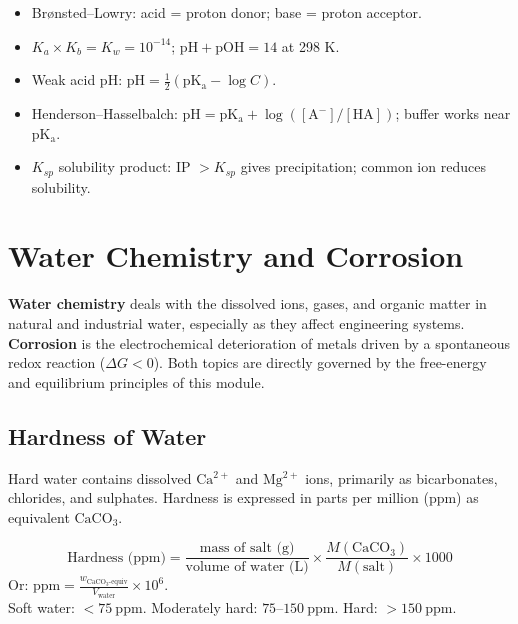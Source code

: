 \documentclass[12pt,a4paper]{article}
\begin{document}
\begin{tcolorbox}[exambox, title={Exam Points (Section 5)}]
\begin{itemize}[leftmargin=*, itemsep=2pt, topsep=2pt]
  \item Brønsted--Lowry: acid = proton donor; base = proton acceptor.
  \item $K_a \times K_b = K_w = 10^{-14}$; $\mathrm{pH + pOH = 14}$ at 298 K.
  \item Weak acid pH: $\mathrm{pH} = \tfrac12(\mathrm{pK_a} - \log C)$.
  \item Henderson--Hasselbalch: $\mathrm{pH} = \mathrm{pK_a} + \log([\mathrm{A^-}]/[\mathrm{HA}])$; buffer works near $\mathrm{pK_a}$.
  \item $K_{sp}$ solubility product: IP $> K_{sp}$ gives precipitation; common ion reduces solubility.
\end{itemize}
\end{tcolorbox}

\section{Water Chemistry and Corrosion}

\begin{tcolorbox}[defbox]
\textbf{Water chemistry} deals with the dissolved ions, gases, and organic matter in natural and industrial water, especially as they affect engineering systems. \textbf{Corrosion} is the electrochemical deterioration of metals driven by a spontaneous redox reaction ($\Delta G < 0$). Both topics are directly governed by the free-energy and equilibrium principles of this module.
\end{tcolorbox}

\subsection{Hardness of Water}
Hard water contains dissolved $\mathrm{Ca^{2+}}$ and $\mathrm{Mg^{2+}}$ ions, primarily as bicarbonates, chlorides, and sulphates. Hardness is expressed in parts per million (ppm) as equivalent $\mathrm{CaCO_3}$.

\begin{tcolorbox}[formulabox, title={Hardness in ppm as \texorpdfstring{$\mathrm{CaCO_3}$}{CaCO3} Equivalent}]
\[
\text{Hardness (ppm)} = \frac{\text{mass of salt (g)}}{\text{volume of water (L)}}\times\frac{M(\mathrm{CaCO_3})}{M(\text{salt})}\times1000
\]
Or: $\text{ppm} = \frac{w_{\mathrm{CaCO_3\text{-equiv}}}}{V_{\text{water}}}\times10^6$.\\
Soft water: $<75\ \mathrm{ppm}$. Moderately hard: $75$--$150\ \mathrm{ppm}$. Hard: $>150\ \mathrm{ppm}$.
\end{tcolorbox}
\end{document}
